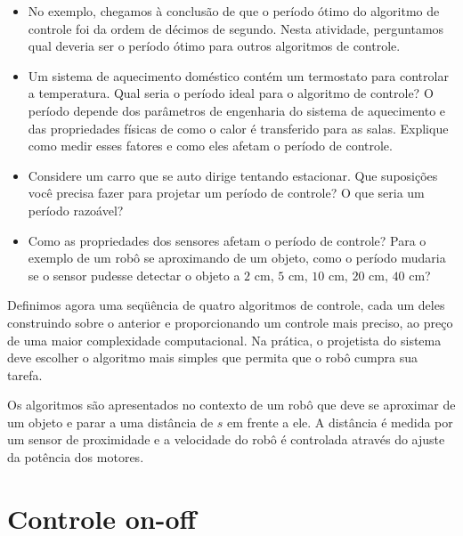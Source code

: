 \begin{framed}
\begin{itemize}
\item No exemplo, chegamos à conclusão de que o período ótimo do algoritmo de controle foi da ordem de décimos de segundo. Nesta atividade, perguntamos qual deveria ser o período ótimo para outros algoritmos de controle.
\item Um sistema de aquecimento doméstico contém um termostato para controlar a temperatura. Qual seria o período ideal para o algoritmo de controle? O período depende dos parâmetros de engenharia do sistema de aquecimento e das propriedades físicas de como o calor é transferido para as salas. Explique como medir esses fatores e como eles afetam o período de controle.
\item Considere um carro que se auto dirige tentando estacionar. Que suposições você precisa fazer para projetar um período de controle? O que seria um período razoável?
\item Como as propriedades dos sensores afetam o período de controle? Para o exemplo de um robô se aproximando de um objeto, como o período mudaria se o sensor pudesse detectar o objeto a $2$ cm, $5$ cm, $10$ cm, $20$ cm, $40$ cm?
\end{itemize}
\end{framed}

Definimos agora uma seqüência de quatro algoritmos de controle, cada um deles construindo sobre o anterior e proporcionando um controle mais preciso, ao preço de uma maior complexidade computacional. Na prática, o projetista do sistema deve escolher o algoritmo mais simples que permita que o robô cumpra sua tarefa.

Os algoritmos são apresentados no contexto de um robô que deve se aproximar de um objeto e parar a uma distância de $s$ em frente a ele. A distância é medida por um sensor de proximidade e a velocidade do robô é controlada através do ajuste da potência dos motores.


\section{Controle on-off}\label{s.on-off}


